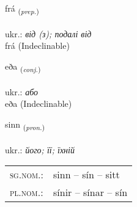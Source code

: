 \documentclass[frontgrid, backgrid]{flacards}\usepackage[]{graphicx}\usepackage[]{xcolor}
\begin{document}
\renewcommand{\blhead}{\vskip5pt {\small\bfseries\footnotesize Forsetning | прийменник }}
\renewcommand{\bcfoot}{\vskip5pt \hspace{2pt}{\small\bfseries\footnotesize 1K}}


{frá \small{\textsubscript{(\textit{prep.})}} \\[1ex]
\textphonetic{[frauː]} \\
ukr.: \emph{від (з); подалі від} \\  [2ex]
frá (Indeclinable)}


\renewcommand{\flhead}{\vskip5pt \fboxsep=0pt {\small\bfseries\footnotesize Samtenging | сполучник}}
\renewcommand{\fcfoot}{\vskip5pt \fboxsep=0pt \hspace{2pt}{\small\bfseries\footnotesize 1K}}

\renewcommand{\blhead}{\vskip5pt {\small\bfseries\footnotesize Samtenging | сполучник }}
\renewcommand{\bcfoot}{\vskip5pt \hspace{2pt}{\small\bfseries\footnotesize 1K}}


{eða \small{\textsubscript{(\textit{conj.})}} \\[1ex]
\textphonetic{[ɛːða]} \\
ukr.: \emph{або} \\  [2ex]
eða (Indeclinable)}

\renewcommand{\flhead}{\vskip5pt \fboxsep=0pt {\small\bfseries\footnotesize Fornafn | займенник}}
\renewcommand{\fcfoot}{\vskip5pt \fboxsep=0pt \hspace{2pt}{\small\bfseries\footnotesize 1K}}

\renewcommand{\blhead}{\vskip5pt {\small\bfseries\footnotesize Fornafn | займенник }}
\renewcommand{\bcfoot}{\vskip5pt \hspace{2pt}{\small\bfseries\footnotesize 1K}}


{sinn \small{\textsubscript{(\textit{pron.})}} \\[1ex] %
\textphonetic{[sɪn]} \\
ukr.: \emph{його; її; їхній} \\  [2ex]
\renewcommand*{\arraystretch}{0.8}
\begin{tabular}{ll}
\textsc{sg.nom.}: & sinn  --  sín -- sitt \\ 
\textsc{pl.nom.}: & sínir -- sínar -- sín
\end{tabular}
}
\end{document}
